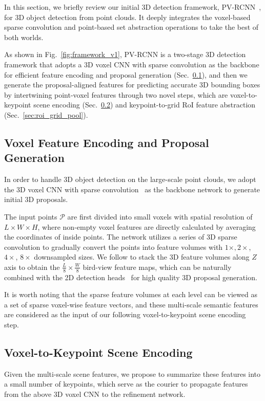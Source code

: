 \documentclass[natbib,twocolumn]{svjour3}          \smartqed  \usepackage{graphicx}
\begin{document}
In this section, we briefly review our initial 3D detection framework, PV-RCNN~\citep{shi2020pv}, for 3D object detection from point clouds. It deeply integrates the voxel-based sparse convolution and point-based set abstraction operations to take the best of both worlds.

As shown in Fig.~\ref{fig:framework_v1}, PV-RCNN is a two-stage 3D detection framework that adopts a 3D voxel CNN with sparse convolution as the backbone for efficient feature encoding and proposal generation (Sec.~\ref{sec:rpn}), and then we generate the proposal-aligned features for predicting accurate 3D bounding boxes by intertwining point-voxel features through two novel steps, which are voxel-to-keypoint scene encoding (Sec.~\ref{sec:vsa}) and keypoint-to-grid RoI feature abstraction (Sec.~\ref{sec:roi_grid_pool}).  

\subsection{Voxel Feature Encoding and Proposal Generation}\label{sec:rpn}
In order to handle 3D object detection on the large-scale point clouds, we adopt the 3D voxel CNN with sparse convolution~\citep{3DSemanticSegmentationWithSubmanifoldSparseConvNet} as the backbone network to generate initial 3D proposals.


The input points $\mathcal{P}$ are first divided into small voxels with spatial resolution of $L\times W \times H$, where non-empty voxel features are directly calculated by averaging the coordinates of inside points. 
The network utilizes a series of 
3D sparse convolution to gradually convert the points into feature volumes with $1\times, 2\times$, $4\times$, $8\times$ downsampled sizes. 
We follow \citep{yan2018second} to stack the 3D feature volumes along $Z$ axis to obtain the $\frac{L}{8}\times\frac{W}{8}$ bird-view feature maps, which can be naturally combined with the 2D detection heads~\citep{liu2016ssd,yin2021center} for high quality 3D proposal generation.  

It is worth noting that the sparse feature volumes at each level can be viewed as a set of sparse voxel-wise feature vectors, and these multi-scale semantic features are considered as the input of our following voxel-to-keypoint scene encoding step.


\subsection{Voxel-to-Keypoint Scene Encoding}\label{sec:vsa}
Given the multi-scale scene features, we propose to summarize these features into a small number of keypoints, which serve as the courier to propagate features from the above 3D voxel CNN to the refinement network.
\end{document}

